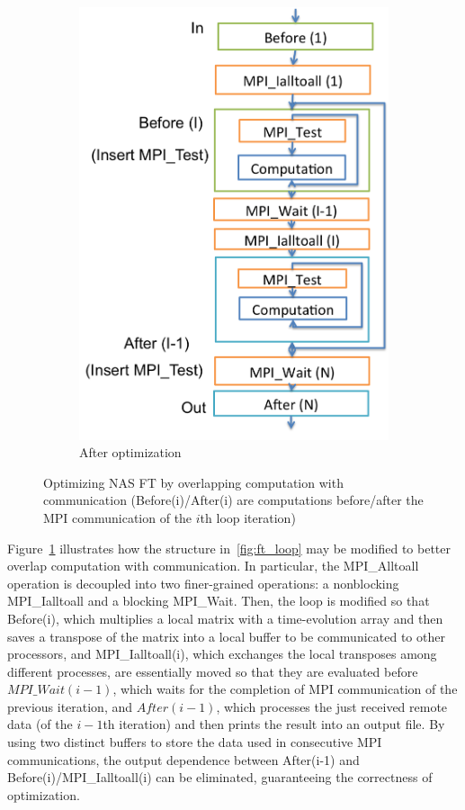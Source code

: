 \begin{figure}
\begin{subfigure}[b]{0.232\textwidth}
    \includegraphics[width=1\textwidth]{fig/ft_cco.png}
    \caption{After optimization}
    \label{fig:ft_cco}
  \end{subfigure}
  \caption{Optimizing NAS FT by
    overlapping computation with communication (Before(i)/After(i) are computations before/after the MPI communication of the $i$th loop iteration)}
\label{fig:ft}
\end{figure}

Figure~\ref{fig:ft_cco} illustrates how the structure
in~\ref{fig:ft_loop} may be modified to better overlap computation
with communication.  In particular, the MPI\_Alltoall operation is
decoupled into two finer-grained operations: a nonblocking
MPI\_Ialltoall and a blocking MPI\_Wait.  Then, the loop is modified
so that Before(i), which multiplies a local matrix with a
time-evolution array and then saves a transpose of the matrix into a
local buffer to be communicated to other processors, and
MPI\_Ialltoall(i), which exchanges the local transposes among different
processes, are essentially moved so that they are evaluated before
$MPI\_Wait(i-1)$, which waits for the completion of MPI communication
of the previous iteration, and $After(i-1)$, which processes the just
received remote data (of the $i-1$th iteration) and then prints the
result into an output file.  By using two distinct buffers to store
the data used in consecutive MPI communications, the output
dependence between After(i-1) and Before(i)/MPI\_Ialltoall(i) can be
eliminated, guaranteeing the correctness of optimization.

